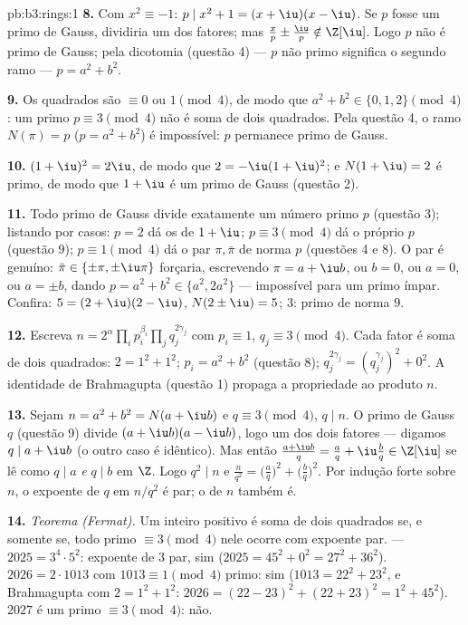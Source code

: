 \begin{solution}{pb:b3:rings:1}
\textbf{8.} Com $x^2 \equiv -1$: $p \mid x^2 + 1 = (x + \iu)(x -
\iu)$. Se $p$ fosse um primo de Gauss,
dividiria um dos fatores; mas $\frac xp \pm \frac \iu p \notin \Z[\iu]$. Logo $p$ não é primo de Gauss;
pela dicotomia (questão 4) --- $p$ não primo significa o segundo ramo
--- $p = a^2 + b^2$.

\textbf{9.} Os quadrados são $\equiv 0$ ou $1 \pmod 4$, de modo que $a^2 + b^2
\in \{0, 1, 2\} \pmod 4$: um primo
$p \equiv 3 \pmod 4$ não é soma de dois quadrados. Pela questão 4, o ramo $N(\pi) = p$ ($p =
a^2+b^2$) é
impossível: $p$ permanece primo de Gauss.

\textbf{10.} $(1 + \iu)^2 = 2\iu$, de modo que $2 = -\iu(1 + \iu)^2$; e $N(1 + \iu) = 2$ é primo, de modo que $1 + \iu$
é um primo de Gauss (questão 2).

\textbf{11.} Todo primo de Gauss divide exatamente um número primo
$p$ (questão 3); listando por casos: $p = 2$ dá os  de
$1 + \iu$; $p \equiv 3 \pmod 4$ dá o próprio $p$ (questão 9); $p \equiv 1 \pmod 4$ dá o par $\pi, \bar\pi$ de
norma $p$ (questões 4 e 8). O par é genuíno: $\bar\pi \in
\{\pm\pi, \pm\iu\pi\}$ forçaria,
escrevendo $\pi = a + \iu b$, ou $b = 0$, ou $a = 0$, ou $a = \pm b$, dando $p = a^2 + b^2 \in
\{a^2, 2a^2\}$
--- impossível para um primo ímpar. Confira: $5 = (2 + \iu)(2 - \iu)$, $N(2\pm\iu) = 5$; $3$: primo
de norma $9$.

\textbf{12.} Escreva $n = 2^{\alpha}\prod_i p_i^{\beta_i} \prod_j
q_j^{2\gamma_j}$ com $p_i \equiv 1$, $q_j \equiv 3 \pmod 4$. Cada fator é soma de dois
quadrados: $2 = 1^2 + 1^2$; $p_i = a^2
+ b^2$ (questão 8); $q_j^{2\gamma_j} = (q_j^{\gamma_j})^2 +
0^2$. A identidade de Brahmagupta
(questão 1) propaga a propriedade ao produto $n$.

\textbf{13.} Sejam $n = a^2 + b^2 = N(a + \iu b)$ e $q \equiv 3
\pmod 4$, $q \mid n$. O primo de Gauss $q$
(questão 9) divide $(a + \iu b)(a - \iu b)$, logo um dos dois fatores --- digamos $q
\mid a + \iu b$ (o
outro caso é idêntico). Mas então $\frac{a +
\iu b}{q} = \frac aq + \iu \frac bq \in \Z[\iu]$ se lê como $q
\mid a$ \emph{e} $q \mid b$
em $\Z$. Logo $q^2 \mid n$ e $\frac n{q^2} =
\bigl(\frac aq\bigr)^2 + \bigl(\frac bq\bigr)^2$. Por indução forte sobre $n$, o
expoente de $q$ em $n/q^2$ é par; o de $n$ também é.

\textbf{14.} \emph{Teorema (Fermat).} Um inteiro positivo é soma de
dois quadrados se, e somente se, todo primo $\equiv 3 \pmod 4$ nele ocorre com
expoente par. --- $2025 = 3^4 \cdot 5^2$: expoente de $3$ par, sim ($2025 = 45^2 + 0^2 = 27^2 + 36^2$). $2026 = 2 \cdot 1013$ com
$1013 \equiv 1 \pmod 4$ primo: sim ($1013 = 22^2 + 23^2$, e Brahmagupta com $2 = 1^2+1^2$: $2026 = (22 - 23)^2 + (22 + 23)^2 = 1^2 + 45^2$). $2027$ é um
primo $\equiv 3 \pmod 4$: não.


\end{solution}
